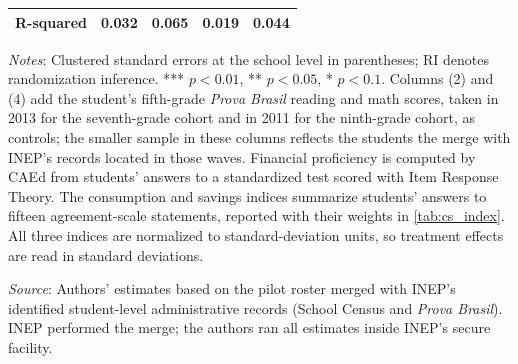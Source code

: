 \documentclass[
	article,			%
	12pt,				%
	oneside,			%
	a4paper,			%
	]{article}
\begin{document}
\begin{table}[ht]
\begin{threeparttable}
\begin{tabular*}{\textwidth}{@{\extracolsep{\fill}}lcccc@{}}
R-squared   &      0.032 &      0.065 &      0.019 &      0.044 \\
\bottomrule
\end{tabular*}
\begin{tablenotes}
\fontsize{9}{9}\selectfont
\item \textit{Notes}: Clustered standard errors at the school level in parentheses; RI denotes randomization inference. *** $p<0.01$, ** $p<0.05$, * $p<0.1$. Columns (2) and (4) add the student's fifth-grade \textit{Prova Brasil} reading and math scores, taken in 2013 for the seventh-grade cohort and in 2011 for the ninth-grade cohort, as controls; the smaller sample in these columns reflects the students the merge with INEP's records located in those waves. Financial proficiency is computed by CAEd from students' answers to a standardized test scored with Item Response Theory. The consumption and savings indices summarize students' answers to fifteen agreement-scale statements, reported with their weights in \autoref{tab:cs_index}. All three indices are normalized to standard-deviation units, so treatment effects are read in standard deviations.
\item \textit{Source}: Authors' estimates based on the pilot roster merged with INEP's identified student-level administrative records (School Census and \textit{Prova Brasil}). INEP performed the merge; the authors ran all estimates inside INEP's secure facility.
\end{tablenotes}
\end{threeparttable}
\end{table}
\end{document}
